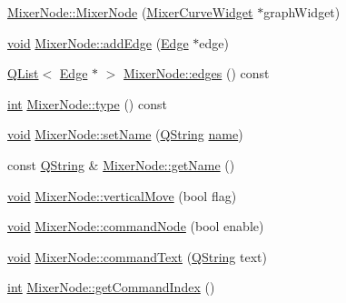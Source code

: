 \begin{DoxyCompactItemize}
\item 
\hyperlink{group___u_a_v_object_widget_utils_gad99e53701553bdb4852ccedd6362f5a2}{Mixer\-Node\-::\-Mixer\-Node} (\hyperlink{class_mixer_curve_widget}{Mixer\-Curve\-Widget} $\ast$graph\-Widget)
\item 
\hyperlink{group___u_a_v_objects_plugin_ga444cf2ff3f0ecbe028adce838d373f5c}{void} \hyperlink{group___u_a_v_object_widget_utils_gaf8a1ccdbffed70e2995e75d37c57851c}{Mixer\-Node\-::add\-Edge} (\hyperlink{class_edge}{Edge} $\ast$edge)
\item 
\hyperlink{class_q_list}{Q\-List}$<$ \hyperlink{class_edge}{Edge} $\ast$ $>$ \hyperlink{group___u_a_v_object_widget_utils_ga40ed4006b807a83e49d061ed3d2660d2}{Mixer\-Node\-::edges} () const 
\item 
\hyperlink{ioapi_8h_a787fa3cf048117ba7123753c1e74fcd6}{int} \hyperlink{group___u_a_v_object_widget_utils_gab4486e1ba0c3c072c94654c3af32b0c6}{Mixer\-Node\-::type} () const 
\item 
\hyperlink{group___u_a_v_objects_plugin_ga444cf2ff3f0ecbe028adce838d373f5c}{void} \hyperlink{group___u_a_v_object_widget_utils_gadfd7806c5496ba5afcd31e2965292feb}{Mixer\-Node\-::set\-Name} (\hyperlink{group___u_a_v_objects_plugin_gab9d252f49c333c94a72f97ce3105a32d}{Q\-String} \hyperlink{glext_8h_ad977737dfc9a274a62741b9500c49a32}{name})
\item 
const \hyperlink{group___u_a_v_objects_plugin_gab9d252f49c333c94a72f97ce3105a32d}{Q\-String} \& \hyperlink{group___u_a_v_object_widget_utils_gade160748ca597706039a14036cf2cf49}{Mixer\-Node\-::get\-Name} ()
\item 
\hyperlink{group___u_a_v_objects_plugin_ga444cf2ff3f0ecbe028adce838d373f5c}{void} \hyperlink{group___u_a_v_object_widget_utils_ga611004aca7ff8a9568500f208f9e4dd8}{Mixer\-Node\-::vertical\-Move} (bool flag)
\item 
\hyperlink{group___u_a_v_objects_plugin_ga444cf2ff3f0ecbe028adce838d373f5c}{void} \hyperlink{group___u_a_v_object_widget_utils_ga3eb17fc4cf477877868bb1d9cc4baad9}{Mixer\-Node\-::command\-Node} (bool enable)
\item 
\hyperlink{group___u_a_v_objects_plugin_ga444cf2ff3f0ecbe028adce838d373f5c}{void} \hyperlink{group___u_a_v_object_widget_utils_ga549e0ca95a0402dfc301e141de9e269e}{Mixer\-Node\-::command\-Text} (\hyperlink{group___u_a_v_objects_plugin_gab9d252f49c333c94a72f97ce3105a32d}{Q\-String} text)
\item 
\hyperlink{ioapi_8h_a787fa3cf048117ba7123753c1e74fcd6}{int} \hyperlink{group___u_a_v_object_widget_utils_ga9256f0cba8c457485bfc00b660076d2b}{Mixer\-Node\-::get\-Command\-Index} ()

\end{DoxyCompactItemize}
